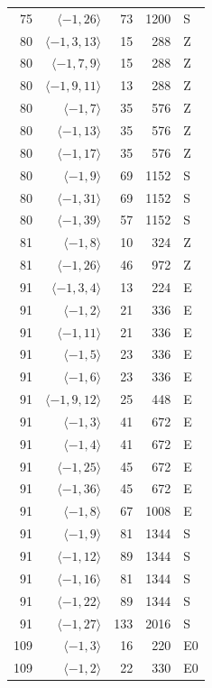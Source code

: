 \begin{longtable}{rrrrl}
75 & $\langle -1, 26\rangle$ & 73 & 1200 & S \\
80 & $\langle -1, 3, 13\rangle$ & 15 & 288 & Z \\
80 & $\langle -1, 7, 9\rangle$ & 15 & 288 & Z \\
80 & $\langle -1, 9, 11\rangle$ & 13 & 288 & Z \\
80 & $\langle -1, 7\rangle$ & 35 & 576 & Z \\
80 & $\langle -1, 13\rangle$ & 35 & 576 & Z \\
80 & $\langle -1, 17\rangle$ & 35 & 576 & Z \\
80 & $\langle -1, 9\rangle$ & 69 & 1152 & S \\
80 & $\langle -1, 31\rangle$ & 69 & 1152 & S \\
80 & $\langle -1, 39\rangle$ & 57 & 1152 & S \\
81 & $\langle -1, 8\rangle$ & 10 & 324 & Z \\
81 & $\langle -1, 26\rangle$ & 46 & 972 & Z \\
91 & $\langle -1, 3, 4\rangle$ & 13 & 224 & E \\
91 & $\langle -1, 2\rangle$ & 21 & 336 & E \\
91 & $\langle -1, 11\rangle$ & 21 & 336 & E \\
91 & $\langle -1, 5\rangle$ & 23 & 336 & E \\
91 & $\langle -1, 6\rangle$ & 23 & 336 & E \\
91 & $\langle -1, 9, 12\rangle$ & 25 & 448 & E \\
91 & $\langle -1, 3\rangle$ & 41 & 672 & E \\
91 & $\langle -1, 4\rangle$ & 41 & 672 & E \\
91 & $\langle -1, 25\rangle$ & 45 & 672 & E \\
91 & $\langle -1, 36\rangle$ & 45 & 672 & E \\
91 & $\langle -1, 8\rangle$ & 67 & 1008 & E \\
91 & $\langle -1, 9\rangle$ & 81 & 1344 & S \\
91 & $\langle -1, 12\rangle$ & 89 & 1344 & S \\
91 & $\langle -1, 16\rangle$ & 81 & 1344 & S \\
91 & $\langle -1, 22\rangle$ & 89 & 1344 & S \\
91 & $\langle -1, 27\rangle$ & 133 & 2016 & S \\
109 & $\langle -1, 3\rangle$ & 16 & 220 & E0 \\
109 & $\langle -1, 2\rangle$ & 22 & 330 & E0 \\

\end{longtable}
